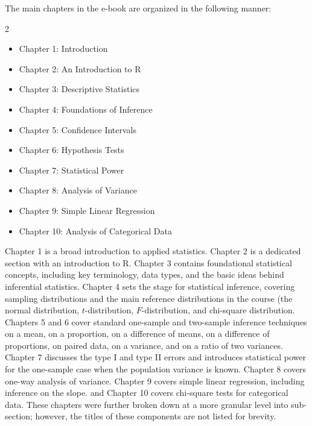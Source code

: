\documentclass[11pt]{article}
\begin{document}
The main chapters in the e-book are organized in the following manner:
\setlength{\columnsep}{-100pt}
\begin{multicols}{2}
\setlength{\columnsep}{30pt}
\begin{itemize}[itemsep=-2.0pt, topsep=-5pt]
\item	Chapter 1: Introduction
\item	Chapter 2: An Introduction to R
\item	Chapter 3: Descriptive Statistics
\item	Chapter 4: Foundations of Inference
\item	Chapter 5: Confidence Intervals
\item	Chapter 6: Hypothesis Tests
\item	Chapter 7: Statistical Power
\item	Chapter 8: Analysis of Variance
\item	Chapter 9: Simple Linear Regression
\item	Chapter 10: Analysis of Categorical Data
\end{itemize}
\end{multicols}

Chapter 1 is a broad introduction to applied statistics.
Chapter 2 is a dedicated section with an introduction to R.
Chapter 3 contains foundational statistical concepts, including key terminology, data types, and the basic ideas behind inferential statistics.
Chapter 4 sets the stage for statistical inference, covering sampling distributions and the main reference distributions in the course (the normal distribution, $t$-distribution, $F$-distribution, and chi-square distribution.
Chapters 5 and 6 cover standard one-sample and two-sample inference techniques on a mean, on a proportion, on a difference of means, on a difference of proportions, on paired data, on a variance, and on a ratio of two variances.
Chapter 7 discusses the type I and type II errors and introduces statistical power for the one-sample case when the population variance is known.
Chapter 8 covers one-way analysis of variance.
Chapter 9 covers simple linear regression, including inference on the slope.
and 
Chapter 10 covers chi-square tests for categorical data.
These chapters were further broken down at a more granular level into sub-section; however, the titles of these components are not listed for brevity.
\end{document}
